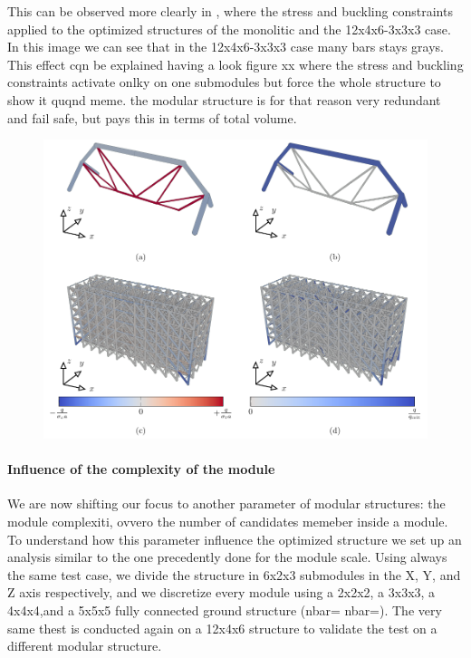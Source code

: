     This can be observed more clearly in , where the stress and buckling constraints applied to the optimized structures of the monolitic and the 12x4x6-3x3x3 case. In this image we can see that in the 12x4x6-3x3x3 case many bars stays grays. This effect cqn be explained having a look figure xx where the stress and buckling constraints activate onlky on one submodules but force the whole structure to show it quqnd meme. the modular structure is for that reason very redundant and fail safe, but pays this in terms of total volume.
    
    \begin{figure}
        \centering
        \includegraphics[width=\linewidth]{figures/05_cellular_opt/00_module_scale_failure/12x4x6_mech.pdf}
        \caption{}
        \label{fig:05_scale_failure}
    \end{figure}

\paragraph{Influence of the complexity of the module}
We are now shifting our focus to another parameter of modular structures: the module complexiti, ovvero the number of candidates memeber inside a module. To understand how this parameter influence the optimized structure we set up an analysis similar to the one precedently done for the module scale. Using always the same test case, we divide the structure in 6x2x3 submodules in the X, Y, and Z axis respectively, and we discretize every module using a 2x2x2, a 3x3x3, a 4x4x4,and a 5x5x5 fully connected ground structure (nbar= nbar=). The very same thest is conducted again on a 12x4x6 structure to validate the test on a different modular structure.

